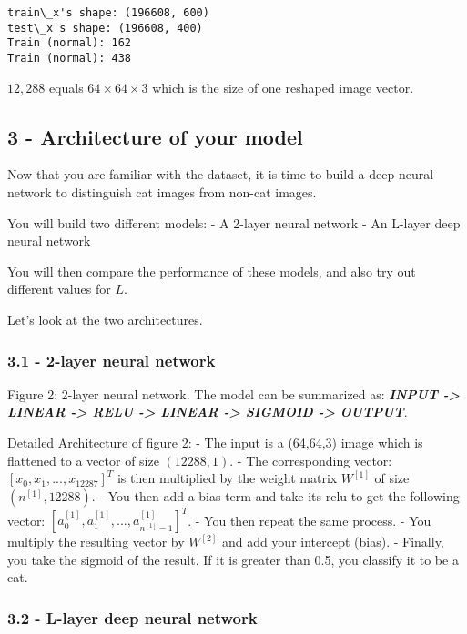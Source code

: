 \documentclass[11pt]{article}
\begin{document}
    \begin{Verbatim}[commandchars=\\\{\}]
train\_x's shape: (196608, 600)
test\_x's shape: (196608, 400)
Train (normal): 162
Train (normal): 438

    \end{Verbatim}

    \(12,288\) equals \(64 \times 64 \times 3\) which is the size of one
reshaped image vector.

    \subsection{3 - Architecture of your
model}\label{architecture-of-your-model}

    Now that you are familiar with the dataset, it is time to build a deep
neural network to distinguish cat images from non-cat images.

You will build two different models: - A 2-layer neural network - An
L-layer deep neural network

You will then compare the performance of these models, and also try out
different values for \(L\).

Let's look at the two architectures.

\subsubsection{3.1 - 2-layer neural network}\label{layer-neural-network}

Figure 2: 2-layer neural network. The model can be summarized as:
\textbf{\emph{INPUT -\textgreater{} LINEAR -\textgreater{} RELU
-\textgreater{} LINEAR -\textgreater{} SIGMOID -\textgreater{} OUTPUT}}.

Detailed Architecture of figure 2: - The input is a (64,64,3) image
which is flattened to a vector of size \((12288,1)\). - The
corresponding vector: \([x_0,x_1,...,x_{12287}]^T\) is then multiplied
by the weight matrix \(W^{[1]}\) of size \((n^{[1]}, 12288)\). - You
then add a bias term and take its relu to get the following vector:
\([a_0^{[1]}, a_1^{[1]},..., a_{n^{[1]}-1}^{[1]}]^T\). - You then repeat
the same process. - You multiply the resulting vector by \(W^{[2]}\) and
add your intercept (bias). - Finally, you take the sigmoid of the
result. If it is greater than 0.5, you classify it to be a cat.

\subsubsection{3.2 - L-layer deep neural
network}\label{l-layer-deep-neural-network}
\end{document}
